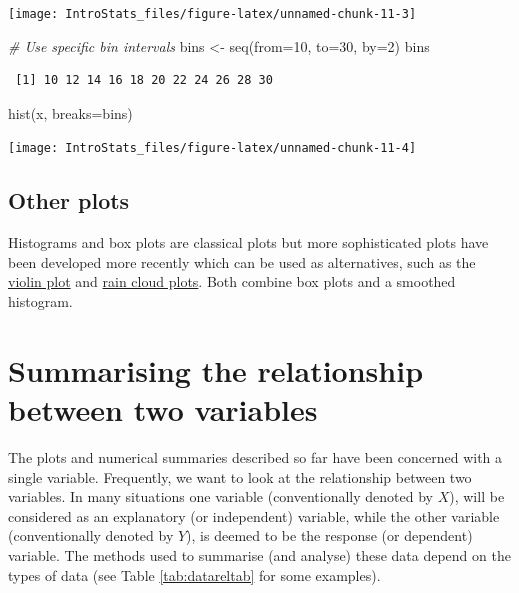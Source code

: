 \documentclass[
  oneside]{krantz}
\newenvironment{Shaded}{\begin{snugshade}}{\end{snugshade}}
\newcommand{\AttributeTok}[1]{\textcolor[rgb]{0.77,0.63,0.00}{#1}}
\newcommand{\CommentTok}[1]{\textcolor[rgb]{0.56,0.35,0.01}{\textit{#1}}}
\newcommand{\DecValTok}[1]{\textcolor[rgb]{0.00,0.00,0.81}{#1}}
\newcommand{\FunctionTok}[1]{\textcolor[rgb]{0.00,0.00,0.00}{#1}}
\newcommand{\NormalTok}[1]{#1}
\newcommand{\OtherTok}[1]{\textcolor[rgb]{0.56,0.35,0.01}{#1}}
\begin{document}
\begin{center}\texttt{[image: IntroStats\_files/figure-latex/unnamed-chunk-11-3]} \end{center}

\begin{Shaded}
\begin{Highlighting}[]
\CommentTok{\# Use specific bin intervals}
\NormalTok{bins }\OtherTok{\textless{}{-}} \FunctionTok{seq}\NormalTok{(}\AttributeTok{from=}\DecValTok{10}\NormalTok{, }\AttributeTok{to=}\DecValTok{30}\NormalTok{, }\AttributeTok{by=}\DecValTok{2}\NormalTok{)}
\NormalTok{bins}
\end{Highlighting}
\end{Shaded}

\begin{verbatim}
 [1] 10 12 14 16 18 20 22 24 26 28 30
\end{verbatim}

\begin{Shaded}
\begin{Highlighting}[]
\FunctionTok{hist}\NormalTok{(x, }\AttributeTok{breaks=}\NormalTok{bins)}
\end{Highlighting}
\end{Shaded}

\begin{center}\texttt{[image: IntroStats\_files/figure-latex/unnamed-chunk-11-4]} \end{center}

\hypertarget{other-plots}{%
\subsection{Other plots}\label{other-plots}}

Histograms and box plots are classical plots but more sophisticated plots have been developed more recently which can be used as alternatives, such as the \href{https://mode.com/blog/violin-plot-examples/}{violin plot} and \href{https://micahallen.org/2018/03/15/introducing-raincloud-plots/}{rain cloud plots}. Both combine box plots and a smoothed histogram.

\hypertarget{summarising-the-relationship-between-two-variables}{%
\section{Summarising the relationship between two variables}\label{summarising-the-relationship-between-two-variables}}

The plots and numerical summaries described so far have been concerned with a single variable. Frequently, we want to look at the relationship between two variables. In many situations one variable (conventionally denoted by \(X\)), will be considered as an explanatory (or independent) variable, while the other variable (conventionally denoted by \(Y\)), is deemed to be the response (or dependent) variable. The methods used to summarise (and analyse) these data depend on the types of data (see Table \ref{tab:datareltab} for some examples).
\end{document}
